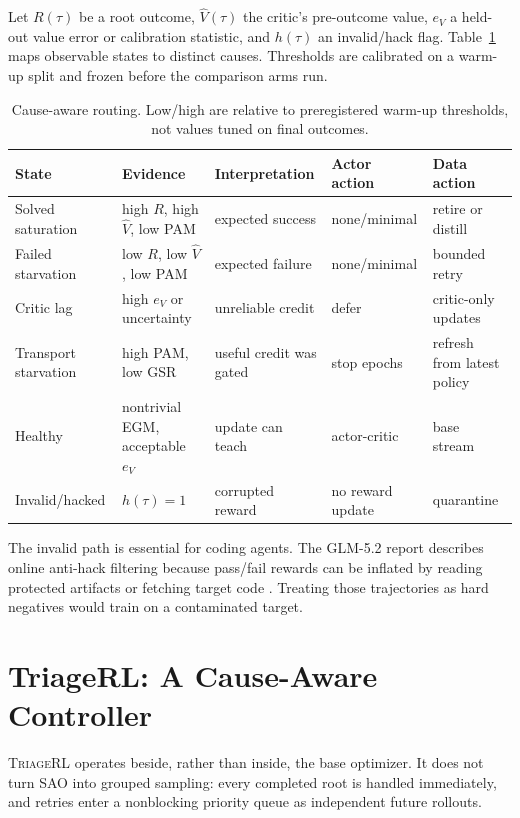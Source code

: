 \documentclass{article}
\newcommand{\method}{\textsc{TriageRL}\xspace}
\begin{document}
Let $R(\tau)$ be a root outcome, $\hat V(\tau)$ the critic's pre-outcome value,
$e_V$ a held-out value error or calibration statistic, and $h(\tau)$ an
invalid/hack flag.  Table~\ref{tab:states} maps observable states to distinct
causes.  Thresholds are calibrated on a warm-up split and frozen before the
comparison arms run.

\begin{table}[t]
\centering
\caption{Cause-aware routing.  Low/high are relative to preregistered
warm-up thresholds, not values tuned on final outcomes.}
\label{tab:states}
\small
\begin{tabularx}{\linewidth}{@{}lXXXX@{}}
\toprule
State & Evidence & Interpretation & Actor action & Data action \\
\midrule
Solved saturation & high $R$, high $\hat V$, low PAM & expected success & none/minimal & retire or distill \\
Failed starvation & low $R$, low $\hat V$, low PAM & expected failure & none/minimal & bounded retry \\
Critic lag & high $e_V$ or uncertainty & unreliable credit & defer & critic-only updates \\
Transport starvation & high PAM, low GSR & useful credit was gated & stop epochs & refresh from latest policy \\
Healthy & nontrivial EGM, acceptable $e_V$ & update can teach & actor-critic & base stream \\
Invalid/hacked & $h(\tau)=1$ & corrupted reward & no reward update & quarantine \\
\bottomrule
\end{tabularx}
\end{table}

The invalid path is essential for coding agents.  The GLM-5.2 report describes
online anti-hack filtering because pass/fail rewards can be inflated by reading
protected artifacts or fetching target code \citep{glm2026glm52}.  Treating
those trajectories as hard negatives would train on a contaminated target.

\section{TriageRL: A Cause-Aware Controller}
\label{sec:controller}

\method operates beside, rather than inside, the base optimizer.  It does not
turn SAO into grouped sampling: every completed root is handled immediately,
and retries enter a nonblocking priority queue as independent future rollouts.
\end{document}
